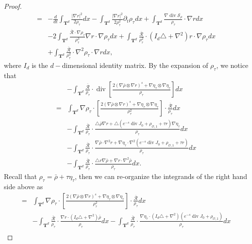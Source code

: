 \documentclass[english]{amsart}
\theoremstyle{plain}
\theoremstyle{definition}
\theoremstyle{remark}
\theoremstyle{plain}
\theoremstyle{plain}
\theoremstyle{plain}
\def\T{{\mathbf T}}%
\def\d{{\partial}}
\DeclareMathOperator{\diver}{div}
\numberwithin{equation}{section}
\begin{document}
\begin{proof}
\begin{align*}
=&-\frac{d}{dt}\int_{\T^d}\frac{|\nabla r|^2}{2\rho_\tau}dx-\int_{\T^d}\frac{|\nabla r|^2}{2\rho_\tau^2}\d_t\rho_\tau dx+\int_{\T^d} \frac{\nabla\diver \mathcal{S}_\rho}{\rho_\tau}\cdot\nabla rdx\\
&-2\int_{\T^d} \frac{\overline{\mathcal{R}}\cdot\nabla\rho_\tau}{\rho_\tau^3}\nabla r\cdot\nabla\rho_\tau dx+\int_{\T^d} \frac{\overline{\mathcal{R}}}{\rho_\tau^2}\cdot(I_d\triangle+\nabla^2)r\cdot\nabla\rho_\tau dx\\
&+\int_{\T^d} \frac{\overline{\mathcal{R}}}{\rho_\tau^2}\cdot\nabla^2\rho_\tau\cdot\nabla r dx,
\end{align*}
where $I_d$ is the $d-$dimensional identity matrix. By the expansion of $\rho_\tau$, we notice that
\begin{align*}
&-\int_{\T^d} \frac{\overline{\mathcal{R}}}{\rho_\tau}\cdot\diver\left[\frac{2(\nabla\bar\rho\otimes \nabla r)^s+\nabla \eta_\tau\otimes \nabla \eta_\tau}{\rho_\tau}\right]dx\\
=&\int_{\T^d} \nabla\rho_\tau\cdot\left[\frac{2(\nabla\bar\rho\otimes \nabla r)^s+\nabla \eta_\tau\otimes \nabla \eta_\tau}{\rho_\tau^2}\right]\cdot\frac{\overline{\mathcal{R}}}{\rho_\tau} dx\\
&-\int_{\T^d} \frac{\overline{\mathcal{R}}}{\rho_\tau}\cdot\frac{\triangle\bar\rho\nabla r+\triangle (e^{-s}\diver J_0+\rho_{\mathcal{O},1}+\tau r)\nabla\eta_\tau}{\rho_\tau}dx\\
&-\int_{\T^d} \frac{\overline{\mathcal{R}}}{\rho_\tau}\cdot\frac{\nabla\bar\rho\cdot\nabla^2 r+\nabla\eta_\tau\cdot\nabla^2(e^{-s}\diver J_0+\rho_{\mathcal{O},1}+\tau r)}{\rho_\tau}dx\\
&-\int_{\T^d} \frac{\overline{\mathcal{R}}}{\rho_\tau}\cdot\frac{\triangle r\nabla\bar\rho+\nabla r\cdot\nabla^2\bar\rho}{\rho_\tau}dx.
\end{align*}
Recall that $\rho_\tau=\bar\rho+\tau\eta_\tau$, then we can re-organize the integrands of the right hand side above as
\begin{align*}
=&\int_{\T^d} \nabla\rho_\tau\cdot\left[\frac{2(\nabla\bar\rho\otimes \nabla r)^s+\nabla \eta_\tau\otimes \nabla \eta_\tau}{\rho_\tau^2}\right]\cdot\frac{\overline{\mathcal{R}}}{\rho_\tau} dx\\
&-\int_{\T^d} \frac{\overline{\mathcal{R}}}{\rho_\tau}\cdot\frac{\nabla r\cdot(I_d\triangle+\nabla^2 )\bar\rho}{\rho_\tau}dx-\int_{\T^d} \frac{\overline{\mathcal{R}}}{\rho_\tau}\cdot\frac{\nabla \eta_\tau\cdot(I_d\triangle+\nabla^2)(e^{-s}\diver J_0+\rho_{\mathcal{O},1})}{\rho_\tau}dx\\

\end{align*}
\end{proof}
\end{document}
